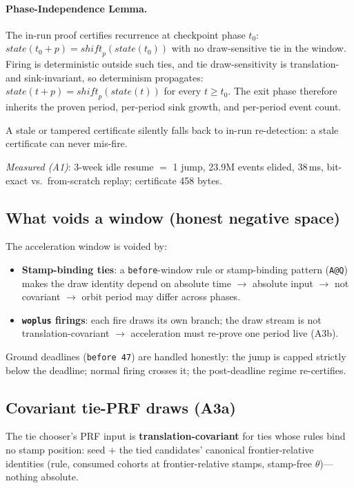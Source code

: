 \documentclass[11pt]{article}
\theoremstyle{remark}
\begin{document}
\paragraph{Phase-Independence Lemma.} The in-run proof certifies recurrence at
checkpoint phase $t_0$: $\mathit{state}(t_0 + p) = \mathit{shift}_p(\mathit{state}(t_0))$
with no draw-sensitive tie in the window.  Firing is deterministic outside such
ties, and tie draw-sensitivity is translation- and sink-invariant, so determinism
propagates: $\mathit{state}(t + p) = \mathit{shift}_p(\mathit{state}(t))$ for
every $t \geq t_0$.  The exit phase therefore inherits the proven period,
per-period sink growth, and per-period event count.

A stale or tampered certificate silently falls back to in-run re-detection: a
stale certificate can never mis-fire.

\textit{Measured (A1)}: 3-week idle resume $=$ 1 jump, 23.9M events elided,
38\,ms, bit-exact vs.\ from-scratch replay; certificate 458 bytes.

\subsection{What voids a window (honest negative space)}
\label{sec:void-window}

The acceleration window is voided by:
\begin{itemize}
\item \textbf{Stamp-binding ties}: a \texttt{before}-window rule or stamp-binding
  pattern (\texttt{A@Q}) makes the draw identity depend on absolute time
  $\to$ absolute input $\to$ not covariant $\to$ orbit period may differ across
  phases.
\item \textbf{\texttt{woplus} firings}: each fire draws its own branch; the draw
  stream is not translation-covariant $\to$ acceleration must re-prove one period
  live (A3b).
\end{itemize}

Ground deadlines (\texttt{before 47}) are handled honestly: the jump is capped
strictly below the deadline; normal firing crosses it; the post-deadline regime
re-certifies.

\subsection{Covariant tie-PRF draws (A3a)}
\label{sec:covariant-prf}

The tie chooser's PRF input is \textbf{translation-covariant} for ties whose
rules bind no stamp position: seed $+$ the tied candidates' canonical
frontier-relative identities (rule, consumed cohorts at frontier-relative stamps,
stamp-free $\theta$)---nothing absolute.
\end{document}
